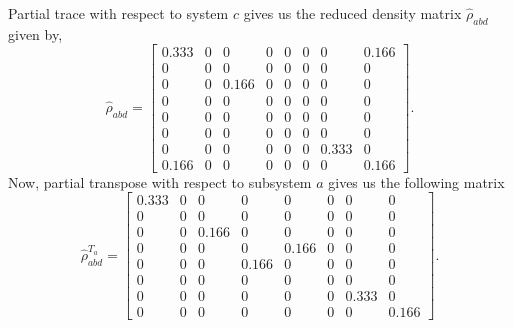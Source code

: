 \documentclass{amsart}
\theoremstyle{plain}
\theoremstyle{definition}
\theoremstyle{plain}
\begin{document}
Partial trace with respect to system $c$ gives us the reduced density matrix $\hat{\rho}_{abd}$ given by,
\begin{equation*}
	\hat{\rho}_{abd} = \left[\begin{matrix}0.333 & 0 & 0 & 0 & 0 & 0 & 0 & 0.166\\0 & 0 & 0 & 0 & 0 & 0 & 0 & 0\\0 & 0 & 0.166 & 0 & 0 & 0 & 0 & 0\\0 & 0 & 0 & 0 & 0 & 0 & 0 & 0\\0 & 0 & 0 & 0 & 0 & 0 & 0 & 0\\0 & 0 & 0 & 0 & 0 & 0 & 0 & 0\\0 & 0 & 0 & 0 & 0 & 0 & 0.333 & 0\\0.166 & 0 & 0 & 0 & 0 & 0 & 0 & 0.166\end{matrix}\right].
\end{equation*}
Now, partial transpose with respect to subsystem $a$ gives us the following matrix
\begin{equation*}
	\hat{\rho}^{T_a}_{abd} =\left[\begin{matrix}0.333 & 0 & 0 & 0 & 0 & 0 & 0 & 0\\0 & 0 & 0 & 0 & 0 & 0 & 0 & 0\\0 & 0 & 0.166 & 0 & 0 & 0 & 0 & 0\\0 & 0 & 0 & 0 & 0.166 & 0 & 0 & 0\\0 & 0 & 0 & 0.166 & 0 & 0 & 0 & 0\\0 & 0 & 0 & 0 & 0 & 0 & 0 & 0\\0 & 0 & 0 & 0 & 0 & 0 & 0.333 & 0\\0 & 0 & 0 & 0 & 0 & 0 & 0 & 0.166\end{matrix}\right]	.
\end{equation*}
\end{document}
